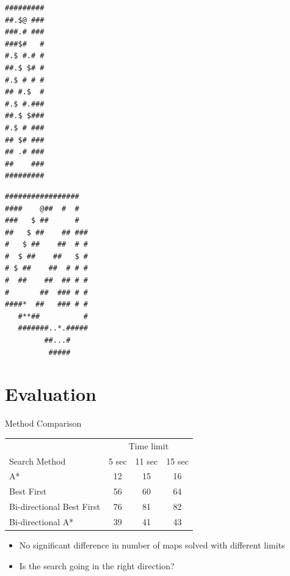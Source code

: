 \documentclass{beamer}
\begin{document}
\begin{lrbox}{\mapss}
  \begin{minipage}{.25\textwidth}
\centering
\small{
\begin{BVerbatim}
#########
##.$@ ###
###.# ###
###$#   #
#.$ #.# #
##.$ $# #
#.$ # # #
## #.$  #
#.$ #.###
##.$ $###
#.$ # ###
## $# ###
## .# ###
##    ###
#########
\end{BVerbatim}
}
  \end{minipage}
\end{lrbox}%

\begin{lrbox}{\mapnt}
  \begin{minipage}{.25\textwidth}
\centering
\small{
\begin{BVerbatim}
#################  
####    @##  #  #  
###   $ ##      #  
##   $ ##    ## ###
#   $ ##    ##  # #
#  $ ##    ##   $ #
# $ ##    ##  # # #
#  ##    ##  ## # #
#       ##  ### # #
####*  ##   ### # #
   #**##          #
   #######..*.#####
         ##...#    
          #####
\end{BVerbatim}
}
  \end{minipage}
\end{lrbox}%




\section{Evaluation}

\begin{frame}{Method Comparison}
  \begin{table}
    \centering
    \begin{tabular}{lccc}
      & \multicolumn{3}{c}{Time limit}\\
      \cline{2-4}
      Search Method              &  5 sec  &  11 sec  &  15 sec  \\
      \hline
      A*                         &     12  &      15  &      16  \\
      Best First                 &     56  &      60  &      64  \\
      Bi-directional Best First  &     76  &      81  &      82  \\
      Bi-directional A*          &     39  &      41  &      43  \\
    \end{tabular}
  \end{table}
  \begin{itemize}
  \item No significant difference in number of maps solved with different limits
  \item Is the search going in the right direction?
  \end{itemize}
\end{frame}
\end{document}
